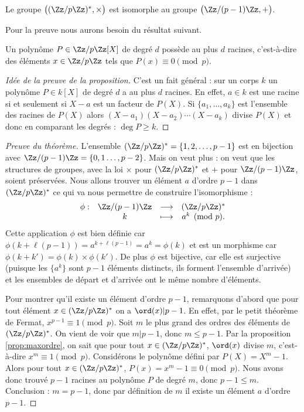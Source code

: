 \documentclass[11pt,class=report,crop=false]{standalone}
\begin{document}
\begin{theoreme}
\label{th:zp}
Le groupe $\big((\Zz/p\Zz)^*,\times\big)$ est isomorphe au groupe $\big(\Zz/(p-1)\Zz,+\big)$.
\end{theoreme}

Pour la preuve nous aurons besoin du résultat suivant.
\begin{proposition}
\label{prop:degre}
Un polynôme $P \in \Zz/p\Zz[X]$ de degré $d$ possède au plus $d$ racines, c'est-à-dire des éléments $x\in\Zz/p\Zz$ tels que $P(x) \equiv 0 \pmod p$.
\end{proposition}


\begin{proof}[Idée de la preuve de la proposition]
C'est un fait général : sur un corps $k$ un polynôme $P \in k[X]$ de degré $d$ a au plus $d$ racines. En effet, $a \in k$ est une racine si et seulement si $X-a$ est un facteur de $P(X)$. Si $\{a_1,\ldots,a_k\}$ est l'ensemble des racines de $P(X)$ alors 
$(X-a_1)(X-a_2)\cdots(X-a_k)$ divise $P(X)$ et donc en comparant les degrés : $\deg P \ge k$.
\end{proof}

\begin{proof}[Preuve du théorème]
L'ensemble $(\Zz/p\Zz)^* = \{1,2,\ldots,p-1\}$ est en bijection avec $\Zz/(p-1)\Zz
= \{0,1\ldots,p-2\}$.
Mais on veut plus : on veut que les structures de groupes, avec la loi \og{}$\times$\fg{} pour  $(\Zz/p\Zz)^*$ et \og{}$+$\fg{} pour $\Zz/(p-1)\Zz$, soient  préservées.
Nous allons trouver un élément $a$ d'ordre $p-1$ dans $(\Zz/p\Zz)^*$ ce qui va nous permettre de construire l'isomorphisme :
$$
\begin{array}{cccc}
\phi : & \Zz/(p-1)\Zz & \longrightarrow & (\Zz/p\Zz)^* \\
       & k            &\longmapsto      & a^k \pmod p.
\end{array}
$$
Cette application $\phi$ est bien définie car $\phi(k+\ell(p-1))= a^{k+\ell(p-1)} = a^k = \phi(k)$ et est un morphisme car $\phi(k+k') = \phi(k) \times \phi(k')$. De plus $\phi$ est bijective, car elle est surjective (puisque les $\{a^k\}$ sont $p-1$ éléments distincts, ils forment l'ensemble d'arrivée) et les ensembles de départ et d'arrivée ont le même nombre d'éléments.

Pour montrer qu'il existe un élément d'ordre $p-1$, remarquons d'abord que pour tout élément $x \in (\Zz/p\Zz)^*$ on a $\ord(x) | p-1$.
En effet, par le petit théorème de Fermat, $x^{p-1} \equiv 1 \pmod {p}$.
Soit $m$ le plus grand des ordres des éléments de $(\Zz/p\Zz)^*$.
On vient de voir que $m | p-1$, donc $m \le p-1$.
Par la proposition \ref{prop:maxordre}, on sait que pour tout $x \in (\Zz/p\Zz)^*$,
$\ord(x)$ divise $m$, c'est-à-dire $x^m \equiv 1 \pmod p$.
Considérons le polynôme défini par $P(X) = X^m-1$. Alors pour tout $x \in (\Zz/p\Zz)^*$,
$P(x) = x^m-1 \equiv 0 \pmod{p}$. Nous avons donc trouvé $p-1$ racines au polynôme $P$ de degré $m$, donc $p-1 \le m$.
Conclusion : $m=p-1$, donc par définition de $m$ il existe un élément $a$ d'ordre $p-1$.
\end{proof}
\end{document}
